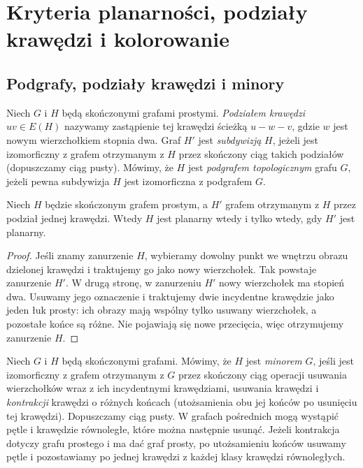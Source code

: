 \chapter{Kryteria planarności, podziały krawędzi i kolorowanie}
\label{ch:tg-kuratowski}

\section{Podgrafy, podziały krawędzi i minory}
\label{sec:tg-rozne-redukcje}

\begin{definicja}
Niech $G$ i $H$ będą skończonymi grafami prostymi.
\emph{Podziałem krawędzi}
$uv\in E(H)$ nazywamy zastąpienie tej krawędzi ścieżką
$u-w-v$, gdzie $w$ jest nowym wierzchołkiem stopnia dwa.
Graf $H'$ jest \emph{subdywizją} $H$, jeżeli jest izomorficzny
z grafem otrzymanym z $H$ przez skończony ciąg takich
podziałów (dopuszczamy ciąg pusty). Mówimy, że $H$ jest \emph{podgrafem
topologicznym} grafu $G$, jeżeli pewna subdywizja $H$
jest izomorficzna z podgrafem $G$.
\end{definicja}

\begin{stwierdzenie}
Niech $H$ będzie skończonym grafem prostym, a $H'$
grafem otrzymanym z $H$ przez podział jednej krawędzi. Wtedy $H$ jest planarny wtedy i tylko wtedy,
gdy $H'$ jest planarny.
\end{stwierdzenie}

\begin{proof}
Jeśli znamy zanurzenie $H$, wybieramy dowolny punkt we wnętrzu
obrazu dzielonej krawędzi i traktujemy go jako nowy wierzchołek.
Tak powstaje zanurzenie $H'$.
W drugą stronę, w zanurzeniu $H'$ nowy wierzchołek ma stopień
dwa. Usuwamy jego oznaczenie i traktujemy dwie incydentne
krawędzie jako jeden łuk prosty: ich obrazy mają wspólny
tylko usuwany wierzchołek, a pozostałe końce są różne.
Nie pojawiają się nowe przecięcia, więc otrzymujemy zanurzenie $H$.
\end{proof}

\begin{definicja}
Niech $G$ i $H$ będą skończonymi grafami. Mówimy, że
$H$ jest \emph{minorem} $G$, jeśli jest izomorficzny
z grafem otrzymanym z $G$ przez skończony ciąg operacji
usuwania wierzchołków wraz z ich incydentnymi krawędziami,
usuwania krawędzi i \emph{kontrakcji} krawędzi o różnych
końcach (utożsamienia obu jej końców po usunięciu tej
krawędzi). Dopuszczamy ciąg pusty. W grafach pośrednich
mogą wystąpić pętle i krawędzie równoległe, które można
następnie usunąć. Jeżeli kontrakcja dotyczy grafu prostego
i ma dać graf prosty, po utożsamieniu końców usuwamy
pętle i pozostawiamy po jednej krawędzi z każdej klasy
krawędzi równoległych.
\end{definicja}

